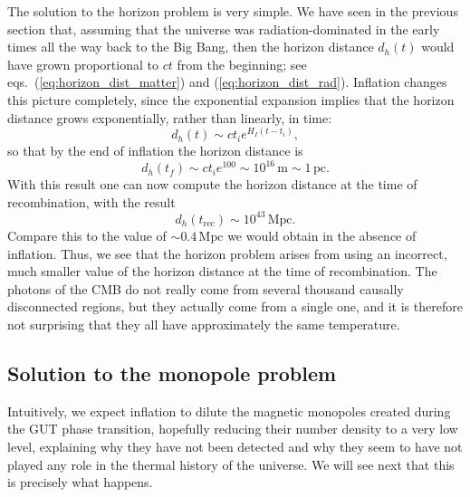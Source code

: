 \documentclass[11pt, a4paper,oneside,openright]{book}
\numberwithin{equation}{section}
\begin{document}
The solution to the horizon problem is very simple. We have seen in the previous section that, assuming that the universe was radiation-dominated in the early times all the way back to the Big Bang, then the horizon distance $d_h(t)$ would have grown proportional to $ct$ from the beginning; see eqs.\ (\ref{eq:horizon_dist_matter}) and (\ref{eq:horizon_dist_rad}). Inflation changes this picture completely, since the exponential expansion implies that the horizon distance grows exponentially, rather than linearly, in time:
\begin{equation}
d_h(t)\sim ct_i e^{H_I(t-t_i)},
\end{equation}
so that by the end of inflation the horizon distance is
\begin{equation}
d_h(t_f)\sim ct_i e^{100}\sim 10^{16}\,{\mathrm{m}}\sim 1\,{\mathrm{pc}}.
\end{equation}
With this result one can now compute the horizon distance at the time of recombination, with the result
\begin{equation}
d_h(t_{\mathrm{rec}})\sim 10^{43}\,{\mathrm{Mpc}}.
\end{equation}
Compare this to the value of $\sim 0.4\,\mathrm{Mpc}$ we would obtain in the absence of inflation. Thus, we see that the horizon problem arises from using an incorrect, much smaller value of the horizon distance at the time of recombination. The photons of the CMB do not really come from several thousand causally disconnected regions, but they actually come from a single one, and it is therefore not surprising that they all have approximately the same temperature.

\subsection{Solution to the monopole problem}

Intuitively, we expect inflation to dilute the magnetic monopoles created during the GUT phase transition, hopefully reducing their number density to a very low level, explaining why they have not been detected and why they seem to have not played any role in the thermal history of the universe. We will see next that this is precisely what happens.
\end{document}
